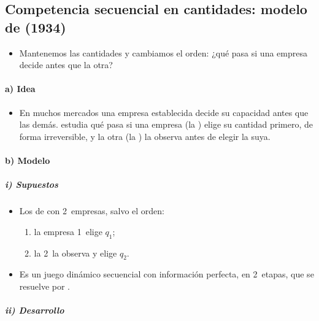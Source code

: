 \documentclass[11pt]{article}
\begin{document}
\subsection{Competencia secuencial en cantidades: modelo de  (1934)}\label{sec:stackelberg}

\begin{itemize}
\item Mantenemos las cantidades y cambiamos el orden: ¿qué pasa si una empresa decide antes que la otra?
\end{itemize}

\paragraph{a) Idea}

\begin{itemize}
\item En muchos mercados una empresa establecida decide su capacidad antes que las demás. \textcite{Stackelberg1934Marktform} estudia qué pasa si una empresa (la ) elige su cantidad primero, de forma irreversible, y la otra (la ) la observa antes de elegir la suya.
\end{itemize}

\paragraph{b) Modelo}

\subparagraph{i) Supuestos}

\begin{itemize}
\item Los de  con 2~empresas, salvo el orden:
  \begin{enumerate}
  \item la empresa 1~elige $q_1$;
  \item la 2~la observa y elige $q_2$.
  \end{enumerate}
\item Es un juego dinámico secuencial con información perfecta, en 2~etapas, que se resuelve por  .
\end{itemize}

\subparagraph{ii) Desarrollo}
\end{document}
